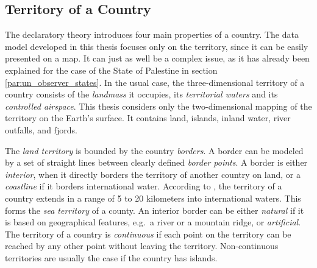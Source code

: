 
\subsection{Territory of a Country} %
\label{sub:territory_of_a_country}

The declaratory theory introduces four main properties of a country. The data model developed in this thesis focuses only on the territory, since it can be easily presented on a map. It can just as well be a complex issue, as it has already been explained for the case of the State of Palestine in section \ref{par:un_observer_states}. In the usual case, the three-dimensional territory of a country consists of the \emph{landmass} it occupies, its \emph{territorial waters} and its \emph{controlled airspace}. This thesis considers only the two-dimensional mapping of the territory on the Earth's surface. It contains land, islands, inland water, river outfalls, and fjords.

The \emph{land territory} is bounded by the country \emph{borders}. A border can be modeled by a set of straight lines between clearly defined \emph{border points}.
A border is either \emph{interior}, when it directly borders the territory of another country on land, or a \emph{coastline} if it borders international water. According to \cite{UNSeaBorders}, the territory of a country extends in a range of 5 to 20 kilometers into international waters. This forms the \emph{sea territory} of a county.
An interior border can be either \emph{natural} if it is based on geographical features, e.g.\ a river or a mountain ridge, or \emph{artificial}.
The territory of a country is \emph{continuous} if each point on the territory can be reached by any other point without leaving the territory. Non-continuous territories are usually the case if the country has islands.

